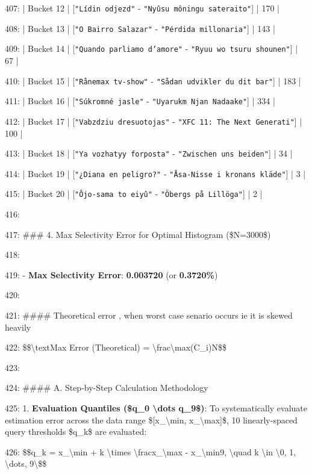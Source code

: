 \documentclass[11pt,a4paper]{article}
\begin{document}
407: | Bucket 12 | [\texttt{"Lídin odjezd"} - \texttt{"Nyûsu môningu sateraito"}] | 170 |

408: | Bucket 13 | [\texttt{"O Bairro Salazar"} - \texttt{"Pérdida millonaria"}] | 143 |

409: | Bucket 14 | [\texttt{"Quando parliamo d'amore"} - \texttt{"Ryuu wo tsuru shounen"}] | 67 |

410: | Bucket 15 | [\texttt{"Rånemax tv-show"} - \texttt{"Sådan udvikler du dit bar"}] | 183 |

411: | Bucket 16 | [\texttt{"Súkromné jasle"} - \texttt{"Uyarukm Njan Nadaake"}] | 334 |

412: | Bucket 17 | [\texttt{"Vabzdziu dresuotojas"} - \texttt{"XFC 11: The Next Generati"}] | 100 |

413: | Bucket 18 | [\texttt{"Ya vozhatyy forposta"} - \texttt{"Zwischen uns beiden"}] | 34 |

414: | Bucket 19 | [\texttt{"¿Diana en peligro?"} - \texttt{"Åsa-Nisse i kronans kläde"}] | 3 |

415: | Bucket 20 | [\texttt{"Ôjo-sama to eiyû"} - \texttt{"Öbergs på Lillöga"}] | 2 |

416:

417: \#\#\# 4. Max Selectivity Error for Optimal Histogram (\$N=3000\$)

418:

419: - \textbf{Max Selectivity Error}: \textbf{0.003720} (or \textbf{0.3720\%})

420:

421: \#\#\#\# Theoretical error , when worst case senario occurs ie it is skewed heavily

422: \$\$\textbackslash{}text{Max Error (Theoretical)} = \textbackslash{}frac{\textbackslash{}max(C\_i)}{N}\$\$

423:

424: \#\#\#\# A. Step-by-Step Calculation Methodology

425: 1. \textbf{Evaluation Quantiles (\$q\_0 \textbackslash{}dots q\_9\$)}: To systematically evaluate estimation error across the data range \$[x\_{\textbackslash{}min}, x\_{\textbackslash{}max}]\$, 10 linearly-spaced query thresholds \$q\_k\$ are evaluated:

426:    \$\$q\_k = x\_{\textbackslash{}min} + k \textbackslash{}times \textbackslash{}frac{x\_{\textbackslash{}max} - x\_{\textbackslash{}min}}{9}, \textbackslash{}quad k \textbackslash{}in \textbackslash{}{0, 1, \textbackslash{}dots, 9\textbackslash{}}\$\$
\end{document}
